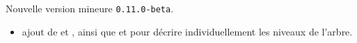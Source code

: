 Nouvelle version mineure \verb+0.11.0-beta+.

\begin{itemize}[itemsep=.5em]
    \item {}
    	  ajout de  et , ainsi que  et  pour décrire individuellement les niveaux de l'arbre.
\end{itemize}


\separation
